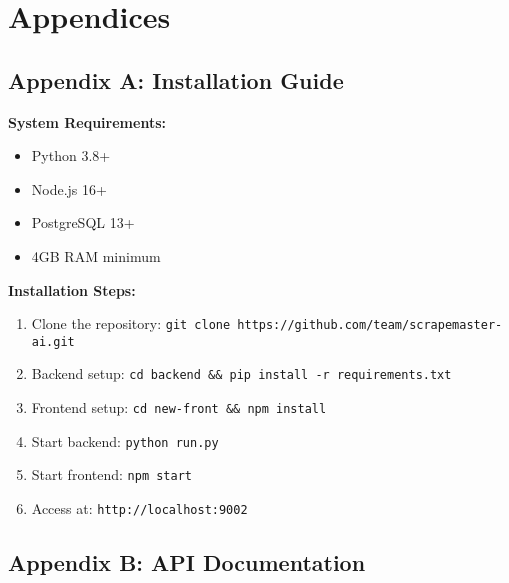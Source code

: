 \documentclass[12pt,a4paper]{report}
\begin{document}
\vspace{2cm}

\begin{center}
\end{center}

\chapter*{Appendices}

\section*{Appendix A: Installation Guide}

\textbf{System Requirements:}
\begin{itemize}
    \item Python 3.8+
    \item Node.js 16+
    \item PostgreSQL 13+
    \item 4GB RAM minimum
\end{itemize}

\textbf{Installation Steps:}
\begin{enumerate}
    \item Clone the repository: \texttt{git clone https://github.com/team/scrapemaster-ai.git}
    \item Backend setup: \texttt{cd backend \&\& pip install -r requirements.txt}
    \item Frontend setup: \texttt{cd new-front \&\& npm install}
    \item Start backend: \texttt{python run.py}
    \item Start frontend: \texttt{npm start}
    \item Access at: \texttt{http://localhost:9002}
\end{enumerate}

\section*{Appendix B: API Documentation}
\end{document}
